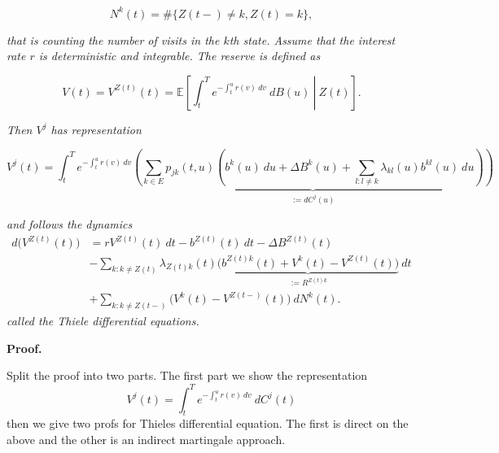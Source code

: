 \documentclass[
]{book}
\begin{document}
\[
N^k(t)=\#\{Z(t-)\ne k,Z(t)=k\},
\]

\emph{that is counting the number of visits in the \(k\)th state. Assume that the interest rate \(r\) is deterministic and integrable. The reserve is defined as}

\[
V(t)=V^{Z(t)}(t)=\mathbb E\left[\left.\int_t^Te^{-\int_t^u r(v)\ dv}\ dB(u)\ \right\vert\ Z(t)\right].
\]

\emph{Then \(V^j\) has representation}

\[
V^j(t)=\int_t^Te^{-\int_t^ur(v)\ dv}\underbrace{\left(\sum_{k\in E}p_{jk}(t,u)\left(b^k(u)\ du+\Delta B^k(u)+\sum_{l:l\ne k}\lambda_{kl}(u)b^{kl}(u)\ du\right)\right)}_{:= dC^j(u)}
\]

\emph{and follows the dynamics}
\begin{align*}
d\Big(V^{Z(t)}(t)\Big)&=rV^{Z(t)}(t)\ dt-b^{Z(t)}(t)\ dt -\Delta B^{Z(t)}(t)\\
&-\sum_{k : k\ne Z(t)}\lambda_{Z(t)k}(t)\underbrace{\Big(b^{Z(t)k}(t)+V^k(t)-V^{Z(t)}(t)\Big)}_{:=R^{Z(t)k}}\ dt\\
&+\sum_{k : k\ne Z(t-)}\Big(V^k(t)-V^{Z(t-)}(t)\Big)\ dN^k(t).
\end{align*}
\emph{called the Thiele differential equations.}

\textbf{Proof.}

Split the proof into two parts. The first part we show the representation
\[
V^j(t)=\int_t^Te^{-\int_t^ur(v)\ dv}\ dC^j(t)
\]
then we give two profs for Thieles differential equation. The first is direct on the above and the other is an indirect martingale approach.
\end{document}
